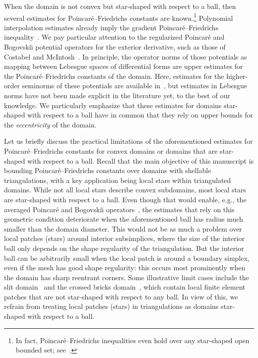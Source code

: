 \documentclass[10pt,a4paper]{article}
\begin{document}
When the domain is not convex but star-shaped with respect to a ball,
then several estimates for Poincar\'e--Friedrichs constants are known.\footnote{In fact, Poincar\'e--Friedrichs inequalities even hold over any star-shaped open bounded set; see~\cite[Theorem~3.1]{hurri1988poincare}.}
Polynomial interpolation estimates already imply the gradient Poincar\'e--Friedrichs inequality~\cite{brenner2008mathematical,ern2021finite}. 
We pay particular attention to the regularized Poincar\'e and Bogovski\u{\i} potential operators for the exterior derivative,
such as those of Costabel and McIntosh~\cite{costabel2010bogovskiui}.
In principle, the operator norms of those potentials as mapping between Lebesgue spaces of differential forms 
are upper estimates for the Poincar\'e--Friedrichs constants of the domain. 
Here, estimates for the higher-order seminorms of these potentials are available in~\cite{guzman2021estimation}, 
but estimates in Lebesgue norms have not been made explicit in the literature yet, to the best of our knowledge.
We particularly emphasize that these estimates for domains star-shaped with respect to a ball have in common that they rely on upper bounds for the \emph{eccentricity} of the domain.


Let us briefly discuss the practical limitations of the aforementioned estimates for Poincar\'e--Friedrichs constants for convex domains or domains that are star-shaped with respect to a ball. 
Recall that the main objective of this manuscript is bounding Poincar\'e--Friedrichs constants over domains with shellable triangulations, with a key application being local stars within triangulated domains. 
While not all local stars describe convex subdomains, most local stars are star-shaped with respect to a ball. 
Even though that would enable, e.g., the averaged Poincar\'e and Bogovski\u{\i} operators~\cite{costabel2010bogovskiui}, 
the estimates that rely on this geometric condition deteriorate when the aforementioned ball has radius much smaller than the domain diameter. 
This would not be as much a problem over local patches (stars) around interior subsimplices, where the size of the interior ball only depends on the shape regularity of the triangulation. 
But the interior ball can be arbitrarily small when the local patch is around a boundary simplex, even if the mesh has good shape regularity: 
this occurs most prominently when the domain has sharp reentrant corners. Some illustrative limit cases include the slit domain~\cite{veeser2012poincare} and the crossed bricks domain~\cite{licht2019smoothed}, 
which contain local finite element patches that are not star-shaped with respect to any ball. 
In view of this, we refrain from treating local patches (stars) in triangulations as domains star-shaped with respect to a ball. 
\end{document}
